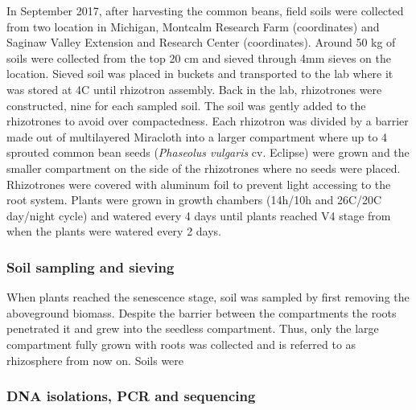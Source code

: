 \documentclass[
]{article}
\begin{document}
In September 2017, after harvesting the common beans, field soils were
collected from two location in Michigan, Montcalm Research Farm
(coordinates) and Saginaw Valley Extension and Research Center
(coordinates). Around 50 kg of soils were collected from the top 20 cm
and sieved through 4mm sieves on the location. Sieved soil was placed in
buckets and transported to the lab where it was stored at 4C until
rhizotron assembly. Back in the lab, rhizotrones were constructed, nine
for each sampled soil. The soil was gently added to the rhizotrones to
avoid over compactedness. Each rhizotron was divided by a barrier made
out of multilayered Miracloth into a larger compartment where up to 4
sprouted common bean seeds (\emph{Phaseolus vulgaris} cv. Eclipse) were
grown and the smaller compartment on the side of the rhizotrones where
no seeds were placed. Rhizotrones were covered with aluminum foil to
prevent light accessing to the root system. Plants were grown in growth
chambers (14h/10h and 26C/20C day/night cycle) and watered every 4 days
until plants reached V4 stage from when the plants were watered every 2
days.

\hypertarget{soil-sampling-and-sieving}{%
\subsubsection{Soil sampling and
sieving}\label{soil-sampling-and-sieving}}

When plants reached the senescence stage, soil was sampled by first
removing the aboveground biomass. Despite the barrier between the
compartments the roots penetrated it and grew into the seedless
compartment. Thus, only the large compartment fully grown with roots was
collected and is referred to as rhizosphere from now on. Soils were

\hypertarget{dna-isolations-pcr-and-sequencing}{%
\subsubsection{DNA isolations, PCR and
sequencing}\label{dna-isolations-pcr-and-sequencing}}
\end{document}
